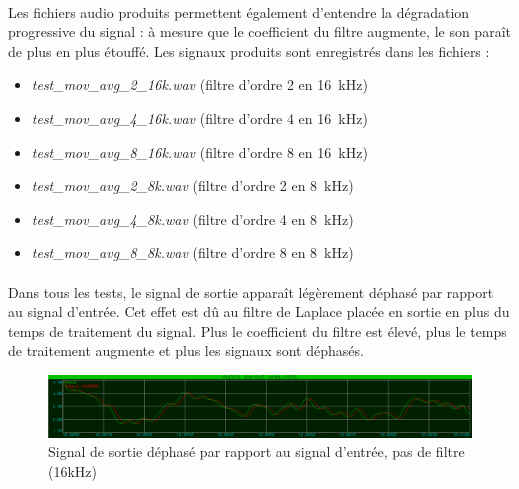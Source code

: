 \documentclass{article}
\begin{document}
    \paragraph{}
    Les fichiers audio produits permettent également d'entendre la dégradation progressive du signal : à mesure que le coefficient du filtre augmente, le son paraît de plus en plus étouffé. Les signaux produits sont enregistrés dans les fichiers :
    \begin{itemize}
        \item \emph{test\_mov\_avg\_2\_16k.wav} (filtre d'ordre 2 en \SI{16}{\kilo\hertz})
        \item \emph{test\_mov\_avg\_4\_16k.wav} (filtre d'ordre 4 en \SI{16}{\kilo\hertz})
        \item \emph{test\_mov\_avg\_8\_16k.wav} (filtre d'ordre 8 en \SI{16}{\kilo\hertz})
        \item \emph{test\_mov\_avg\_2\_8k.wav} (filtre d'ordre 2 en \SI{8}{\kilo\hertz})
        \item \emph{test\_mov\_avg\_4\_8k.wav} (filtre d'ordre 4 en \SI{8}{\kilo\hertz})
        \item \emph{test\_mov\_avg\_8\_8k.wav} (filtre d'ordre 8 en \SI{8}{\kilo\hertz})
    \end{itemize}

    \paragraph{}
    Dans tous les tests, le signal de sortie apparaît légèrement déphasé par rapport au signal d'entrée. Cet effet est dû au filtre de Laplace placée en sortie en plus du temps de traitement du signal. Plus le coefficient du filtre est élevé, plus le temps de traitement augmente et plus les signaux sont déphasés.

    \begin{figure}[H]
        \centering
        \includegraphics[width=\textwidth]{./images/out_no_filter_drake_16k.png}
        \caption{Signal de sortie déphasé par rapport au signal d'entrée, pas de filtre (16kHz)}
    \end{figure}
\end{document}
